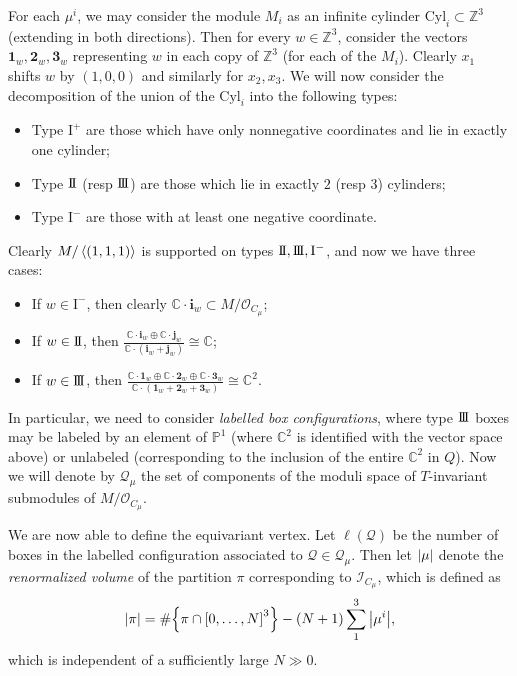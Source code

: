\documentclass[leqno, openany]{memoir}
\theoremstyle{definition}
\theoremstyle{remark}
\theoremstyle{plain}
\theoremstyle{definition}
\theoremstyle{remark}
\newcommand{\C}{\mathbb{C}}
\newcommand{\Z}{\mathbb{Z}}
\renewcommand{\P}{\mathbb{P}}
\newcommand{\mc}[1]{\mathcal{#1}}
\newcommand{\mr}[1]{\mathrm{#1}}
\newcommand{\1}{\mathbf{1}}
\newcommand{\2}{\mathbf{2}}
\newcommand{\3}{\mathbf{3}}
\newcommand{\I}{\mathrm{I}}
\newcommand{\II}{\mr{I}\hspace{-1.3pt}\mr{I}}
\newcommand{\III}{\mr{I}\hspace{-1.3pt}\mr{I}\hspace{-1.3pt}\mr{I}}
\begin{document}
For each $\mu^i$, we may consider the module $M_i$ as an infinite cylinder $\mr{Cyl}_i \subset \Z^3$ (extending in both directions). Then for every $w \in \Z^3$, consider the vectors $\1_w, \2_w, \3_w$ representing $w$ in each copy of $\Z^3$ (for each of the $M_i$). Clearly $x_1$ shifts $w$ by $(1,0,0)$ and similarly for $x_2, x_3$. We will now consider the decomposition of the union of the $\mr{Cyl}_i$ into the following types:
\begin{itemize}
    \item Type $\I^+$ are those which have only nonnegative coordinates and lie in exactly one cylinder;
    \item Type $\II$ (resp $\III$) are those which lie in exactly $2$ (resp $3$) cylinders;
    \item Type $\I^-$ are those with at least one negative coordinate.
\end{itemize}
Clearly $M / \ev{(1,1,1)}$ is supported on types $\II, \III, \I^-$, and now we have three cases:
\begin{itemize}
    \item If $w \in \I^-$, then clearly $\C \cdot \mathbf{i}_w \subset M/\mc{O}_{C_{\mu}}$;
    \item If $w \in \II$, then $\frac{\C \cdot \mathbf{i}_w \oplus \C \cdot \mathbf{j}_w}{\C \cdot (\mathbf{i}_w + \mathbf{j}_w)} \cong \C$;
    \item If $w \in \III$, then $\frac{\C \cdot \1_w \oplus \C \cdot \2_w \oplus \C \cdot \3_w}{\C \cdot (\1_w + \2_w + \3_w)} \cong \C^2$.
\end{itemize}
In particular, we need to consider \textit{labelled box configurations}, where type $\III$ boxes may be labeled by an element of $\P^1$ (where $\C^2$ is identified with the vector space above) or unlabeled (corresponding to the inclusion of the entire $\C^2$ in $Q$). Now we will denote by $\mc{Q}_{\mu}$ the set of components of the moduli space of $T$-invariant submodules of $M/\mc{O}_{C_{\mu}}$.

We are now able to define the equivariant vertex. Let $\ell(\mc{Q})$ be the number of boxes in the labelled configuration associated to $\mc{Q} \in \mc{Q}_{\mu}$. Then let $\abs{\mu}$ denote the \textit{renormalized volume} of the partition $\pi$ corresponding to $\mc{I}_{C_{\mu}}$, which is defined as
\[ \abs{\pi} = \# \qty{\pi \cap {[0, \ldots, N]}^3} - (N+1) \sum_1^3 \abs{\mu^i}, \]
which is independent of a sufficiently large $N \gg 0$. 
\end{document}
